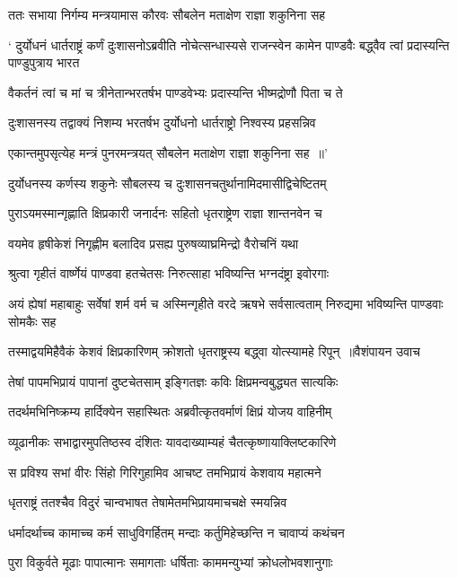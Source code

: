 \twolineshloka
{ततः सभाया निर्गम्य मन्त्रयामास कौरवः}
{सौबलेन मताक्षेण राज्ञा शकुनिना सह}


\threelineshloka
{` दुर्योधनं धार्तराष्ट्रं कर्णं दुःशासनोऽब्रवीति}
{नोचेत्सन्धास्यसे राजन्स्वेन कामेन पाण्डवैः}
{बद्ध्वैव त्वां प्रदास्यन्ति पाण्डुपुत्राय भारत}


\twolineshloka
{वैकर्तनं त्वां च मां च त्रीनेतान्भरतर्षभ}
{पाण्डवेभ्यः प्रदास्यन्ति भीष्मद्रोणौ पिता च ते}


\twolineshloka
{दुःशासनस्य तद्वाक्यं निशम्य भरतर्षभ}
{दुर्योधनो धार्तराष्ट्रो निश्वस्य प्रहसन्निव}


\twolineshloka
{एकान्तमुपसृत्येह मन्त्रं पुनरमन्त्रयत्}
{सौबलेन मताक्षेण राज्ञा शकुनिना सह ॥'}


\twolineshloka
{दुर्योधनस्य कर्णस्य शकुनेः सौबलस्य च}
{दुःशासनचतुर्थानामिदमासीद्विचेष्टितम्}


\twolineshloka
{पुराऽयमस्मान्गृह्णाति क्षिप्रकारी जनार्दनः}
{सहितो धृतराष्ट्रेण राज्ञा शान्तनवेन च}


\twolineshloka
{वयमेव हृषीकेशं निगृह्णीम बलादिव}
{प्रसह्य पुरुषव्याघ्रमिन्द्रो वैरोचनिं यथा}


\twolineshloka
{श्रुत्वा गृहीतं वार्ष्णेयं पाण्डवा हतचेतसः}
{निरुत्साहा भविष्यन्ति भग्नदंष्ट्रा इवोरगाः}


\threelineshloka
{अयं ह्येषां महाबाहुः सर्वेषां शर्म वर्म च}
{अस्मिन्गृहीते वरदे ऋषभे सर्वसात्वताम्}
{निरुद्यमा भविष्यन्ति पाण्डवाः सोमकैः सह}


\threelineshloka
{तस्माद्वयमिहैवैकं केशवं क्षिप्रकारिणम्}
{क्रोशतो धृतराष्ट्रस्य बद्ध्वा योत्स्यामहे रिपून् ॥वैशंपायन उवाच}
{}


\twolineshloka
{तेषां पापमभिप्रायं पापानां दुष्टचेतसाम्}
{इङ्गितज्ञः कविः क्षिप्रमन्वबुद्ध्यत सात्यकिः}


\twolineshloka
{तदर्थमभिनिष्क्रम्य हार्दिक्येन सहास्थितः}
{अब्रवीत्कृतवर्माणं क्षिप्रं योजय वाहिनीम्}


\twolineshloka
{व्यूढानीकः सभाद्वारमुपतिष्ठस्व दंशितः}
{यावदाख्याम्यहं चैतत्कृष्णायाक्लिष्टकारिणे}


\twolineshloka
{स प्रविश्य सभां वीरः सिंहो गिरिगुहामिव}
{आचष्ट तमभिप्रायं केशवाय महात्मने}


\twolineshloka
{धृतराष्ट्रं ततश्चैव विदुरं चान्वभाषत}
{तेषामेतमभिप्रायमाचचक्षे स्मयन्निव}


\twolineshloka
{धर्मादर्थाच्च कामाच्च कर्म साधुविगर्हितम्}
{मन्दाः कर्तुमिहेच्छन्ति न चावाप्यं कथंचन}


\twolineshloka
{पुरा विकुर्वते मूढाः पापात्मानः समागताः}
{धर्षिताः काममन्युभ्यां क्रोधलोभवशानुगाः}


